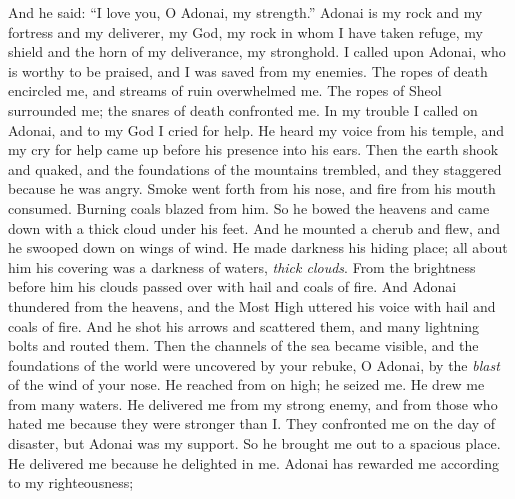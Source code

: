 \begin{biblechapter} %
 And he said: 
“I love you, O Adonai, my strength.”
\verse Adonai is my rock and my fortress and my deliverer, 
my God, my rock in whom I have taken refuge, 
my shield and the horn of my deliverance, my stronghold.
\verse I called upon Adonai, who is worthy to be praised, 
and I was saved from my enemies.
\verse The ropes of death encircled me, 
and streams of ruin overwhelmed me.
\verse The ropes of Sheol surrounded me; 
the snares of death confronted me.
\verse In my trouble I called on Adonai, 
and to my God I cried for help. 
He heard my voice from his temple, 
and my cry for help 
came up before his presence into his ears.
\verse Then the earth shook and quaked, 
and the foundations of the mountains trembled, 
and they staggered because he was angry.
\verse Smoke went forth from his nose, 
and fire from his mouth consumed. 
Burning coals blazed from him.
\verse So he bowed the heavens and came down 
with a thick cloud under his feet.
\verse And he mounted a cherub and flew, 
and he swooped down on wings of wind.
\verse He made darkness his hiding place; 
all about him his covering 
was a darkness of waters, \textit{thick clouds}.
\verse From the brightness before him 
his clouds passed over 
with hail and coals of fire.
\verse And Adonai thundered from the heavens, 
and the Most High uttered his voice 
with hail and coals of fire.
\verse And he shot his arrows and scattered them, 
and many lightning bolts and routed them.
\verse Then the channels of the sea became visible, 
and the foundations of the world were uncovered 
by your rebuke, O Adonai, 
by the \textit{blast} of the wind of your nose.
\verse He reached from on high; he seized me. 
He drew me from many waters.
\verse He delivered me from my strong enemy, 
and from those who hated me 
because they were stronger than I.
\verse They confronted me on the day of disaster, 
but Adonai was my support.
\verse So he brought me out to a spacious place. 
He delivered me because he delighted in me.
\verse Adonai has rewarded me according to my righteousness; 

\end{biblechapter}

